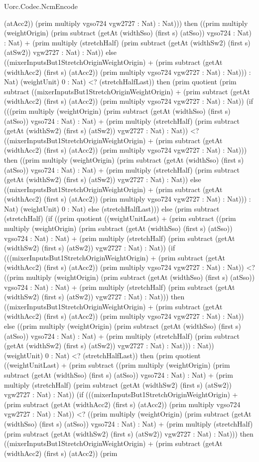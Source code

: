 \begin{lexlean}{Uorc.Codec.NcmEncode}
\begin{semanticmodule}
{(atAcc2)) (prim multiply vgso724 vgw2727 : Nat) : Nat))) then ((prim multiply (weightOrigin) (prim subtract (getAt (widthSso) (first s) (atSso)) vgso724 : Nat) : Nat) + (prim multiply (stretchHalf) (prim subtract (getAt (widthSw2) (first s) (atSw2)) vgw2727 : Nat) : Nat)) else ((mixerInputsBut1StretchOriginWeightOrigin) + (prim subtract (getAt (widthAcc2) (first s) (atAcc2)) (prim multiply vgso724 vgw2727 : Nat) : Nat))) : Nat) (weightUnit) 0 : Nat) <? (stretchHalfLast)) then (prim quotient (prim subtract ((mixerInputsBut1StretchOriginWeightOrigin) + (prim subtract (getAt (widthAcc2) (first s) (atAcc2)) (prim multiply vgso724 vgw2727 : Nat) : Nat)) (if (((prim multiply (weightOrigin) (prim subtract (getAt (widthSso) (first s) (atSso)) vgso724 : Nat) : Nat) + (prim multiply (stretchHalf) (prim subtract (getAt (widthSw2) (first s) (atSw2)) vgw2727 : Nat) : Nat)) <? ((mixerInputsBut1StretchOriginWeightOrigin) + (prim subtract (getAt (widthAcc2) (first s) (atAcc2)) (prim multiply vgso724 vgw2727 : Nat) : Nat))) then ((prim multiply (weightOrigin) (prim subtract (getAt (widthSso) (first s) (atSso)) vgso724 : Nat) : Nat) + (prim multiply (stretchHalf) (prim subtract (getAt (widthSw2) (first s) (atSw2)) vgw2727 : Nat) : Nat)) else ((mixerInputsBut1StretchOriginWeightOrigin) + (prim subtract (getAt (widthAcc2) (first s) (atAcc2)) (prim multiply vgso724 vgw2727 : Nat) : Nat))) : Nat) (weightUnit) 0 : Nat) else (stretchHalfLast))) else (prim subtract (stretchHalf) (if ((prim quotient ((weightUnitLast) + (prim subtract ((prim multiply (weightOrigin) (prim subtract (getAt (widthSso) (first s) (atSso)) vgso724 : Nat) : Nat) + (prim multiply (stretchHalf) (prim subtract (getAt (widthSw2) (first s) (atSw2)) vgw2727 : Nat) : Nat)) (if (((mixerInputsBut1StretchOriginWeightOrigin) + (prim subtract (getAt (widthAcc2) (first s) (atAcc2)) (prim multiply vgso724 vgw2727 : Nat) : Nat)) <? ((prim multiply (weightOrigin) (prim subtract (getAt (widthSso) (first s) (atSso)) vgso724 : Nat) : Nat) + (prim multiply (stretchHalf) (prim subtract (getAt (widthSw2) (first s) (atSw2)) vgw2727 : Nat) : Nat))) then ((mixerInputsBut1StretchOriginWeightOrigin) + (prim subtract (getAt (widthAcc2) (first s) (atAcc2)) (prim multiply vgso724 vgw2727 : Nat) : Nat)) else ((prim multiply (weightOrigin) (prim subtract (getAt (widthSso) (first s) (atSso)) vgso724 : Nat) : Nat) + (prim multiply (stretchHalf) (prim subtract (getAt (widthSw2) (first s) (atSw2)) vgw2727 : Nat) : Nat))) : Nat)) (weightUnit) 0 : Nat) <? (stretchHalfLast)) then (prim quotient ((weightUnitLast) + (prim subtract ((prim multiply (weightOrigin) (prim subtract (getAt (widthSso) (first s) (atSso)) vgso724 : Nat) : Nat) + (prim multiply (stretchHalf) (prim subtract (getAt (widthSw2) (first s) (atSw2)) vgw2727 : Nat) : Nat)) (if (((mixerInputsBut1StretchOriginWeightOrigin) + (prim subtract (getAt (widthAcc2) (first s) (atAcc2)) (prim multiply vgso724 vgw2727 : Nat) : Nat)) <? ((prim multiply (weightOrigin) (prim subtract (getAt (widthSso) (first s) (atSso)) vgso724 : Nat) : Nat) + (prim multiply (stretchHalf) (prim subtract (getAt (widthSw2) (first s) (atSw2)) vgw2727 : Nat) : Nat))) then ((mixerInputsBut1StretchOriginWeightOrigin) + (prim subtract (getAt (widthAcc2) (first s) (atAcc2)) (prim }
\end{semanticmodule}
\end{lexlean}
